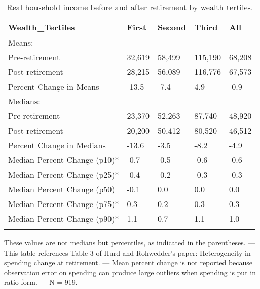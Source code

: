 \begin{table}[tbp] \centering
{}

\caption{Real household income before and after retirement by wealth tertiles.}
\begin{tabularx}{\textwidth}{lCCCC}

\toprule
{Wealth\_Tertiles}&{First}&{Second}&{Third}&{All} \tabularnewline
\midrule\addlinespace[1.5ex]
Means:&&&& \tabularnewline
\midrule Pre-retirement&32,619&58,499&115,190&68,208 \tabularnewline
Post-retirement&28,215&56,089&116,776&67,573 \tabularnewline
Percent Change in Means&-13.5&-7.4&4.9&-0.9 \tabularnewline
\midrule Medians:&&&& \tabularnewline
\midrule Pre-retirement&23,370&52,263&87,740&48,920 \tabularnewline
Post-retirement&20,200&50,412&80,520&46,512 \tabularnewline
Percent Change in Medians&-13.6&-3.5&-8.2&-4.9 \tabularnewline
Median Percent Change (p10)*&-0.7&-0.5&-0.6&-0.6 \tabularnewline
Median Percent Change (p25)*&-0.4&-0.2&-0.3&-0.3 \tabularnewline
Median Percent Change (p50)&-0.1&0.0&0.0&0.0 \tabularnewline
Median Percent Change (p75)*&0.3&0.2&0.3&0.3 \tabularnewline
Median Percent Change (p90)*&1.1&0.7&1.1&1.0 \tabularnewline
\bottomrule \addlinespace[1.5ex]

\end{tabularx}
\begin{flushleft}
\footnotesize *These values are not medians but percentiles, as indicated in the parentheses. \linebreak --- \linebreak This table references Table 3 of Hurd and Rohwedder's paper: Heterogeneity in spending change at retirement. \linebreak --- \linebreak Mean percent change is not reported because observation error on spending can produce large outliers when spending is put in ratio form. \linebreak --- \linebreak N = 919.
\end{flushleft}
\end{table}
